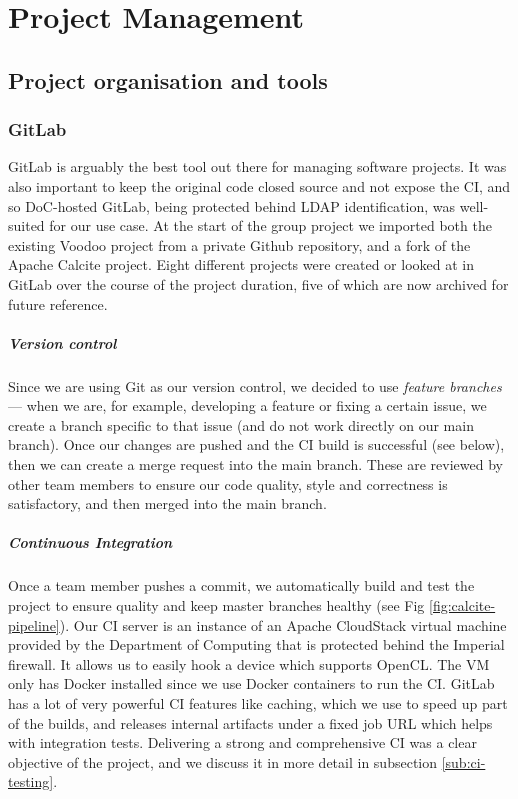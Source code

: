 \chapter{Project Management}

\section{Project organisation and tools}

\subsection{GitLab}

GitLab is arguably the best tool out there for managing software projects. It was also important to keep the original code closed source and not expose the CI, and so DoC-hosted GitLab, being protected behind LDAP identification, was well-suited for our use case. At the start of the group project we imported both the existing Voodoo project from a private Github repository, and a fork of the Apache Calcite project. Eight different projects were created or looked at in GitLab over the course of the project duration, five of which are now archived for future reference.

\paragraph{Version control}
Since we are using Git as our version control, we decided to use \textit{feature branches} — when we are, for example, developing a feature or fixing a certain issue, we create a branch specific to that issue (and do not work directly on our main branch). Once our changes are pushed and the CI build is successful (see below), then we can create a merge request into the main branch. These are reviewed by other team members to ensure our code quality, style and correctness is satisfactory, and then merged into the main branch.

\paragraph{Continuous Integration}
Once a team member pushes a commit, we automatically build and test the project to ensure quality and keep master branches healthy (see Fig \ref{fig:calcite-pipeline}). Our CI server is an instance of an Apache CloudStack virtual machine provided by the Department of Computing that is protected behind the Imperial firewall. It allows us to easily hook a device which supports OpenCL. The VM only has Docker installed since we use Docker containers to run the CI. GitLab has a lot of very powerful CI features like caching, which we use to speed up part of the builds, and releases internal artifacts under a fixed job URL which helps with integration tests. Delivering a strong and comprehensive CI was a clear objective of the project, and we discuss it in more detail in subsection \ref{sub:ci-testing}.

